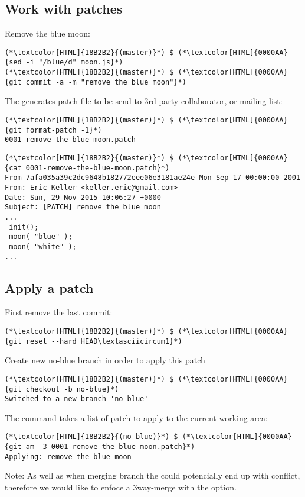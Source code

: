 \subsection{Work with patches}
\begin{frame}[fragile]
    \subslidetitle

  Remove the blue moon:
  \begin{lstlisting}
(*\textcolor[HTML]{18B2B2}{(master)}*) $ (*\textcolor[HTML]{0000AA}{sed -i "/blue/d" moon.js}*)
(*\textcolor[HTML]{18B2B2}{(master)}*) $ (*\textcolor[HTML]{0000AA}{git commit -a -m "remove the blue moon"}*)
\end{lstlisting}

  The  generates patch file to be send to 3rd party collaborator, or mailing list:
  \begin{lstlisting}
(*\textcolor[HTML]{18B2B2}{(master)}*) $ (*\textcolor[HTML]{0000AA}{git format-patch -1}*)
0001-remove-the-blue-moon.patch
\end{lstlisting}

  \begin{lstlisting}
(*\textcolor[HTML]{18B2B2}{(master)}*) $ (*\textcolor[HTML]{0000AA}{cat 0001-remove-the-blue-moon.patch}*)
From 7afa035a39c2dc9648b182772eee06e3181ae24e Mon Sep 17 00:00:00 2001
From: Eric Keller <keller.eric@gmail.com>
Date: Sun, 29 Nov 2015 10:06:27 +0000
Subject: [PATCH] remove the blue moon
...
 init();
-moon( "blue" );
 moon( "white" );
...
\end{lstlisting}

\end{frame}

\subsection{Apply a patch}
\begin{frame}[fragile]
    \subslidetitle
  First remove the last commit:
  \begin{lstlisting}
(*\textcolor[HTML]{18B2B2}{(master)}*) $ (*\textcolor[HTML]{0000AA}{git reset --hard HEAD\textasciicircum1}*)
\end{lstlisting}
  Create new no-blue branch in order to apply this patch
  \begin{lstlisting}
(*\textcolor[HTML]{18B2B2}{(master)}*) $ (*\textcolor[HTML]{0000AA}{git checkout -b no-blue}*)
Switched to a new branch 'no-blue'
\end{lstlisting}

  The  command takes a list of patch to apply to the current working area:
  \begin{lstlisting}
(*\textcolor[HTML]{18B2B2}{(no-blue)}*) $ (*\textcolor[HTML]{0000AA}{git am -3 0001-remove-the-blue-moon.patch}*)
Applying: remove the blue moon
\end{lstlisting}

  Note: As well as when merging branch the  could potencially end up with conflict, therefore we would like to enfoce a 3way-merge with the  option.

\end{frame}

